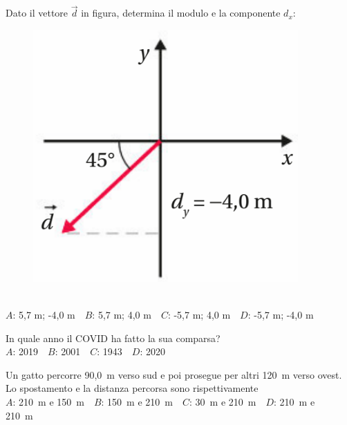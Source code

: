 \mcquestionfooter



\def\mcquestionnumber{4}


\mcquestionheader Dato il vettore $\vec{d}$ in figura, determina il modulo e la componente $d_x$: \begin{figure}[h!]   \begin{center}     \includegraphics[scale=0.35]{vettored.png}   \end{center} \end{figure}\\
{$A$}: 5,7 m; -4,0 m\ \ {$B$}: 5,7 m; 4,0 m\ \ {$C$}: -5,7 m; 4,0 m\ \ {$D$}: -5,7 m; -4,0 m\ \ 

\mcquestionfooter



\def\mcquestionnumber{5}


\mcquestionheader In quale anno il COVID ha fatto la sua comparsa?\\
{$A$}: 2019\ \ {$B$}: 2001\ \ {$C$}: 1943\ \ {$D$}: 2020\ \ 

\mcquestionfooter



\def\mcquestionnumber{6}


\mcquestionheader Un gatto percorre 90,0~m verso sud e poi prosegue per altri 120~m verso ovest. Lo spostamento e la distanza percorsa sono rispettivamente\\
{$A$}: 210~m e 150~m\ \ {$B$}: 150~m e 210~m\ \ {$C$}: 30~m e 210~m\ \ {$D$}: 210~m e 210~m\ \ 

\mcquestionfooter



